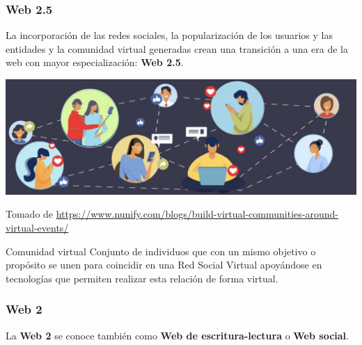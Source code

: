 \documentclass[
10pt, %
aspectratio=169, %
]{beamer}
\begin{document}
	\begin{frame}
		
		\frametitle{Web 2.5}
		
		 La incorporación de las redes sociales, la popularización de los usuarios y las entidades y la comunidad virtual generadas crean una transición a una era de la web con mayor especialización: \textbf{Web 2.5}. \\[2mm]
		
		\begin{centering}
			
			\includegraphics[scale=0.2]{comunidad.png} 
			
			{\scriptsize Tomado de \url{https://www.nunify.com/blogs/build-virtual-communities-around-virtual-events/}} 
			
		\end{centering}
		
		\vspace{0.8\baselineskip}
		
		\begin{alertblock}{Comunidad virtual}
			Conjunto de individuos que con un mismo objetivo o propósito se unen para coincidir en una Red Social Virtual apoyándose en tecnologías que permiten realizar esta relación de forma virtual.
		\end{alertblock}
		
		
	\end{frame}
	
	\begin{frame}
		
		\frametitle{Web 2}
		
		La \textbf{Web 2} se conoce también como \textbf{Web de escritura-lectura} o \textbf{Web social}.
		
	\end{frame}
	
\end{document}
